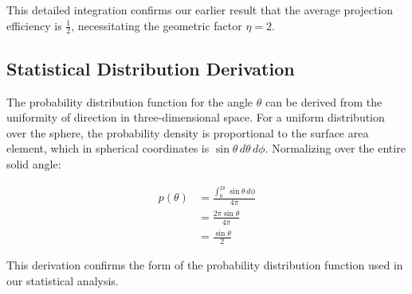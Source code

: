 \documentclass[nature,numbers]{article}
\newcommand{\expre}[1]{\begin{align}#1\end{align}} %
\begin{document}
This detailed integration confirms our earlier result that the average projection efficiency is $\frac{1}{2}$, necessitating the geometric factor $\eta = 2$.

\subsection{Statistical Distribution Derivation}

The probability distribution function for the angle $\theta$ can be derived from the uniformity of direction in three-dimensional space. For a uniform distribution over the sphere, the probability density is proportional to the surface area element, which in spherical coordinates is $\sin\theta \, d\theta \, d\phi$. Normalizing over the entire solid angle:

\expre{p(\theta) &= \frac{\int_0^{2\pi} \sin\theta \, d\phi}{4\pi} \\
&= \frac{2\pi \sin\theta}{4\pi} \\
&= \frac{\sin\theta}{2}
}

This derivation confirms the form of the probability distribution function used in our statistical analysis.



\end{document}
